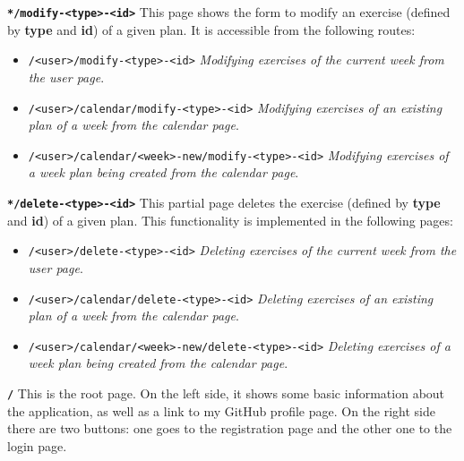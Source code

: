 \documentclass[12pt,twoside,titlepage,a4paper]{article}
\theoremstyle{definicion}
\theoremstyle{lema}
\theoremstyle{teorema}
\theoremstyle{corolario}
\theoremstyle{ejemplo}
\theoremstyle{nota}
\begin{document}
\newline\newline
\texttt{\textbf{*/modify-<type>-<id>}}
\newline\newline
This page shows the form to modify an exercise (defined by \textbf{type} and \textbf{id}) of a given plan. It is accessible from the
following routes:
\begin{itemize} [noitemsep]
	\item \texttt{/<user>/modify-<type>-<id>} \textit{Modifying exercises of the current week from the user page}.
	\item \texttt{/<user>/calendar/modify-<type>-<id>} \textit{Modifying exercises of an existing plan of a week from the calendar page}.
	\item \texttt{/<user>/calendar/<week>-new/modify-<type>-<id>} \textit{Modifying exercises of a week plan being created from the calendar page}.
\end{itemize}
\texttt{\textbf{*/delete-<type>-<id>}}
\newline\newline
This partial page deletes the exercise (defined by \textbf{type} and \textbf{id}) of a given plan. This functionality is implemented
in the following pages:
\begin{itemize} [noitemsep]
	\item \texttt{/<user>/delete-<type>-<id>} \textit{Deleting exercises of the current week from the user page}.
	\item \texttt{/<user>/calendar/delete-<type>-<id>} \textit{Deleting exercises of an existing plan of a week from the calendar page}.
	\item \texttt{/<user>/calendar/<week>-new/delete-<type>-<id>} \textit{Deleting exercises of a week plan being created from the calendar page}.
\end{itemize}
\texttt{\textbf{/}}
\newline\newline
This is the root page. On the left side, it shows some basic information about the application, as well as a link to my GitHub profile
page. On the right side there are two buttons: one goes to the registration page and the other one to the login page.
\end{document}
